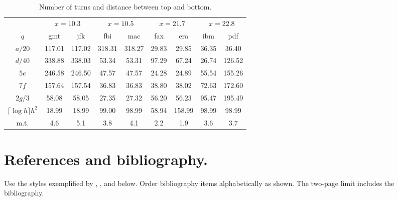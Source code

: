 \documentclass[twoside]{article}
\begin{document}
\begin{table}[h]
\begin{center} {\footnotesize
\begin{tabular}{|c|cc|cc|cc|cc|}
\hline
 & \multicolumn{2}{c|}{$x=10.3$} & \multicolumn{2}{c|}{$x=10.5$} &
\multicolumn{2}{c|}{$x=21.7$} & \multicolumn{2}{c|}{$x=22.8$} \\
$q$  & \multicolumn{1}{c}{gmt} & \multicolumn{1}{c|}{jfk} &
\multicolumn{1}{c}{fbi} & \multicolumn{1}{c|}{mac} & \multicolumn{1}{c}{fax} &
\multicolumn{1}{c|}{era} & \multicolumn{1}{c}{ibm} &
\multicolumn{1}{c|}{pdf}\\\hline
$a/20$ &     117.01 & 117.02  &   318.31 & 318.27  &   29.83 & 29.85    & 36.35 
& 36.40 \\
$d/40$  &     338.88 & 338.03  &   53.34 & 53.31  &  97.29 & 67.24 &   26.74 &
126.52 \\
$5e$ &     246.58 & 246.50  &   47.57 & 47.57  &  24.28 & 24.89 &   55.54 &
155.26 \\
$7f$    &     157.64 & 157.54  &   36.83 & 36.83  &  38.80 & 38.02 &   72.63 &
172.60 \\
$2g/3$   &     58.08 & 58.05  &   27.35 & 27.32  &  56.20 & 56.23 &   95.47 &
195.49 \\
$\lceil \log h \rceil h^2$    &     18.99 & 18.99  &   99.00 & 98.99  &  58.94 &
158.99 &   98.99 & 98.99 \\
\hline m.t. &     4.6 &  5.1 &     3.8 &  4.1 &     2.2 & 1.9  &   3.6 &  3.7 \\
\hline
\end{tabular} }
\end{center}
\caption{\footnotesize Number of turns and distance between top and bottom.}
\label{turns}
\end{table}

\section{\large References and bibliography.}

Use the styles exemplified by \cite{HB98}, \cite{CA}, \cite{MSW00} and
\cite{Rei91} below.  Order bibliography items alphabetically as shown.  The
two-page limit includes the bibliography.
 
\end{document}
